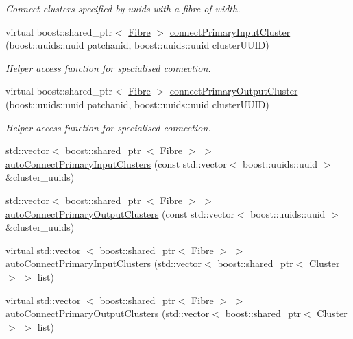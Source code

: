 \begin{DoxyCompactItemize}
\begin{DoxyCompactList}\small\item\em \-Connect clusters specified by uuids with a fibre of width. \end{DoxyCompactList}\item 
virtual boost\-::shared\-\_\-ptr$<$ \hyperlink{classcryomesh_1_1structures_1_1Fibre}{\-Fibre} $>$ \hyperlink{classcryomesh_1_1structures_1_1Bundle_abe23b17f35ef338df7db8d2903ee2bfd}{connect\-Primary\-Input\-Cluster} (boost\-::uuids\-::uuid patchanid, boost\-::uuids\-::uuid cluster\-U\-U\-I\-D)
\begin{DoxyCompactList}\small\item\em \-Helper access function for specialised connection. \end{DoxyCompactList}\item 
virtual boost\-::shared\-\_\-ptr$<$ \hyperlink{classcryomesh_1_1structures_1_1Fibre}{\-Fibre} $>$ \hyperlink{classcryomesh_1_1structures_1_1Bundle_a01dd3e844fe3332df9be5156e329f821}{connect\-Primary\-Output\-Cluster} (boost\-::uuids\-::uuid patchanid, boost\-::uuids\-::uuid cluster\-U\-U\-I\-D)
\begin{DoxyCompactList}\small\item\em \-Helper access function for specialised connection. \end{DoxyCompactList}\item 
std\-::vector$<$ boost\-::shared\-\_\-ptr\*
$<$ \hyperlink{classcryomesh_1_1structures_1_1Fibre}{\-Fibre} $>$ $>$ \hyperlink{classcryomesh_1_1structures_1_1Bundle_a31fef59219384dafb4d250eae65f3574}{auto\-Connect\-Primary\-Input\-Clusters} (const std\-::vector$<$ boost\-::uuids\-::uuid $>$ \&cluster\-\_\-uuids)
\item 
std\-::vector$<$ boost\-::shared\-\_\-ptr\*
$<$ \hyperlink{classcryomesh_1_1structures_1_1Fibre}{\-Fibre} $>$ $>$ \hyperlink{classcryomesh_1_1structures_1_1Bundle_a53f6a455e7cb553352dbef64d3a1ec04}{auto\-Connect\-Primary\-Output\-Clusters} (const std\-::vector$<$ boost\-::uuids\-::uuid $>$ \&cluster\-\_\-uuids)
\item 
virtual std\-::vector\*
$<$ boost\-::shared\-\_\-ptr$<$ \hyperlink{classcryomesh_1_1structures_1_1Fibre}{\-Fibre} $>$ $>$ \hyperlink{classcryomesh_1_1structures_1_1Bundle_aae9fb3393c44f4aeff03ecb8bfa5316e}{auto\-Connect\-Primary\-Input\-Clusters} (std\-::vector$<$ boost\-::shared\-\_\-ptr$<$ \hyperlink{classcryomesh_1_1structures_1_1Cluster}{\-Cluster} $>$ $>$ list)
\item 
virtual std\-::vector\*
$<$ boost\-::shared\-\_\-ptr$<$ \hyperlink{classcryomesh_1_1structures_1_1Fibre}{\-Fibre} $>$ $>$ \hyperlink{classcryomesh_1_1structures_1_1Bundle_a7e38b0167e7873fea9d768d3b096a9d8}{auto\-Connect\-Primary\-Output\-Clusters} (std\-::vector$<$ boost\-::shared\-\_\-ptr$<$ \hyperlink{classcryomesh_1_1structures_1_1Cluster}{\-Cluster} $>$ $>$ list)

\end{DoxyCompactItemize}
